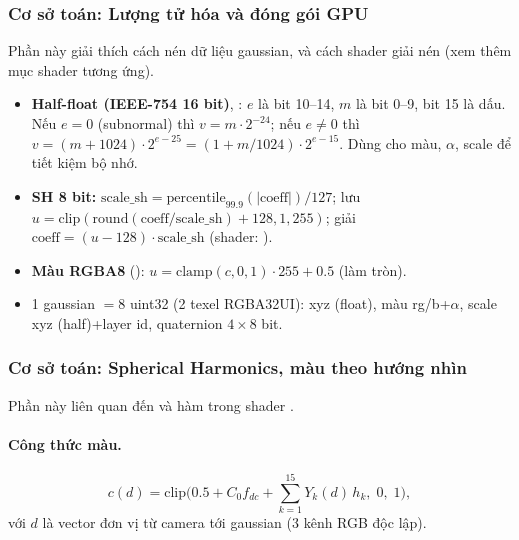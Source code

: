 \subsubsection{Cơ sở toán: Lượng tử hóa và đóng gói GPU}
Phần này giải thích cách  nén dữ liệu gaussian, và cách shader  giải nén (xem thêm mục shader tương ứng).
\begin{itemize}
\item \textbf{Half-float (IEEE-754 16 bit)}, : $e$ là bit 10--14, $m$ là bit 0--9, bit 15 là dấu. Nếu $e=0$ (subnormal) thì $v=m\cdot2^{-24}$; nếu $e\ne0$ thì $v=(m+1024)\cdot2^{e-25}=(1+m/1024)\cdot2^{e-15}$. Dùng cho màu, $\alpha$, scale để tiết kiệm bộ nhớ.
\item \textbf{SH 8 bit:} $\mathrm{scale\_sh}=\mathrm{percentile}_{99.9}(|\mathrm{coeff}|)/127$; lưu $u=\mathrm{clip}(\mathrm{round}(\mathrm{coeff}/\mathrm{scale\_sh})+128,1,255)$; giải $\mathrm{coeff}=(u-128)\cdot\mathrm{scale\_sh}$ (shader: ).
\item \textbf{Màu RGBA8} (): $u=\mathrm{clamp}(c,0,1)\cdot255+0.5$ (làm tròn).
\item 1 gaussian $=8$ uint32 (2 texel RGBA32UI): xyz (float), màu rg/b+$\alpha$, scale xyz (half)+layer id, quaternion $4\times8$ bit.
\end{itemize}

\subsubsection{Cơ sở toán: Spherical Harmonics, màu theo hướng nhìn}
Phần này liên quan đến  và hàm  trong shader .

\paragraph{Công thức màu.}
\[
c(d)=\mathrm{clip}\Big(0.5+C_0 f_{dc}+\sum_{k=1}^{15}Y_k(d)\,h_k,\;0,\;1\Big),
\]
với $d$ là vector đơn vị từ camera tới gaussian (3 kênh RGB độc lập).

